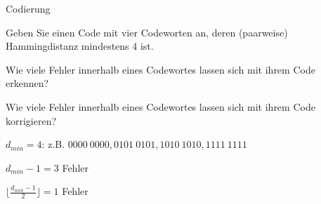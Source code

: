 \documentclass{exercisesheet}
\begin{document}
\begin{exercises}{Codierung}
\item Geben Sie einen Code mit vier Codeworten an, deren (paarweise) Hammingdistanz mindestens 4 ist.\points[4]
\item Wie viele Fehler innerhalb eines Codewortes lassen sich mit ihrem Code erkennen?\points
\item Wie viele Fehler innerhalb eines Codewortes lassen sich mit ihrem Code korrigieren?\points
\end{exercises}

\begin{solutions}
  \item $d_{min}=4$: z.B. $0000\ 0000, 0101\ 0101, 1010\ 1010, 1111\ 1111$
  \item $d_{min}-1=3$ Fehler
  \item $\lfloor\frac{d_{min}-1}{2}\rfloor=1$ Fehler
\end{solutions}
\end{document}

